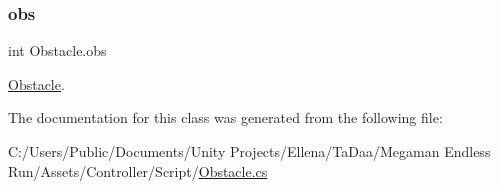 \subsubsection{\texorpdfstring{obs}{obs}}
{\footnotesize\ttfamily int Obstacle.\+obs}



\hyperlink{class_obstacle}{Obstacle}. 



The documentation for this class was generated from the following file\+:\begin{DoxyCompactItemize}
\item 
C\+:/\+Users/\+Public/\+Documents/\+Unity Projects/\+Ellena/\+Ta\+Daa/\+Megaman Endless Run/\+Assets/\+Controller/\+Script/\hyperlink{_obstacle_8cs}{Obstacle.\+cs}\end{DoxyCompactItemize}
